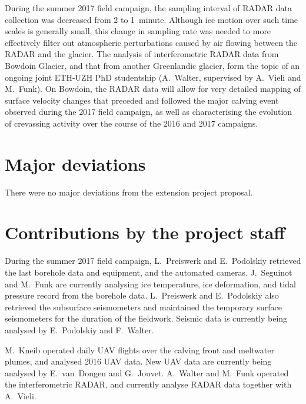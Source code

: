 \documentclass{article}
\begin{document}
    During the summer 2017 field campaign, the sampling interval of RADAR data
    collection was decreased from 2 to 1~minute. Although ice motion over such
    time scales is generally small, this change in sampling rate was needed to
    more effectively filter out atmospheric perturbations caused by air flowing
    between the RADAR and the glacier. The analysis of interferometric RADAR
    data from Bowdoin Glacier, and that from another Greenlandic glacier, form
    the topic of an ongoing joint ETH-UZH PhD studentship (A.~Walter,
    supervised by A.~Vieli and M.~Funk). On Bowdoin, the RADAR data will allow
    for very detailed mapping of surface velocity changes that preceded and
    followed the major calving event observed during the 2017 field campaign,
    as well as characterising the evolution of crevassing activity over the
    course of the 2016 and 2017 campaigns.


\section{Major deviations}

    There were no major deviations from the extension project proposal.


\section{Contributions by the project staff}

    During the summer 2017 field campaign, L.~Preiswerk and E.~Podolskiy
    retrieved the last borehole data and equipment, and the automated cameras.
    J.~Seguinot and M.~Funk are currently analysing ice temperature, ice
    deformation, and tidal pressure record from the borehole data. L.~Preiswerk
    and E.~Podolskiy also retrieved the subsurface seismometers and maintained
    the temporary surface seismometers for the duration of the fieldwork.
    Seismic data is currently being analysed by E.~Podolskiy and F.~Walter.

    M.~Kneib operated daily UAV flights over the calving front and meltwater
    plumes, and analysed 2016 UAV data. New UAV data are currently being
    analysed by E.~van~Dongen and G.~Jouvet. A.~Walter and M.~Funk operated the
    interferometric RADAR, and currently analyse RADAR data together with
    A.~Vieli.
\end{document}
